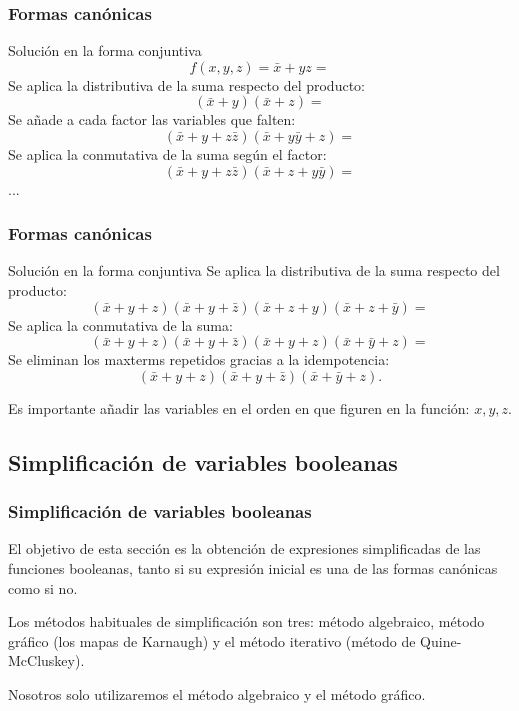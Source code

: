 \documentclass{beamer}
\begin{document}
\begin{frame}
\frametitle{Formas can\'onicas}
\begin{block}{Soluci\'on en la forma conjuntiva}
\[f(x,y,z) = \bar{x} + yz =\]
Se aplica la distributiva de la suma respecto del producto:
\[ (\bar x + y)(\bar x+z) = \]
Se a\~nade a cada factor las variables que falten:
\[ (\bar x + y +z\bar z)(\bar x+y\bar y+z) = \]
Se aplica la conmutativa de la suma seg\'un el factor:
\[ (\bar x + y +z\bar z)(\bar x+z+y\bar y) = \]
...
\end{block}
\end{frame}


\begin{frame}
\frametitle{Formas can\'onicas}
\begin{block}{Soluci\'on en la forma conjuntiva}
Se aplica la distributiva de la suma respecto del producto:
\[ (\bar x + y +z)(\bar x + y +\bar z)(\bar x+z+y)(\bar x+z+\bar y) = \]
Se aplica la conmutativa de la suma:
\[ (\bar x + y +z)(\bar x + y +\bar z)(\bar x+y+z)(\bar x+\bar y+z) = \]
Se eliminan los maxterms repetidos gracias a la idempotencia:
\[ (\bar x + y +z)(\bar x + y +\bar z)(\bar x+\bar y+z). \]
\end{block}
Es importante a\~nadir las variables en el orden en que figuren en la funci\'on: $x,y,z$.
\end{frame}




\subsection{Simplificaci\'on de variables booleanas}


\begin{frame}
\frametitle{Simplificaci\'on de variables booleanas}
El objetivo de esta secci\'on es la obtenci\'on de expresiones simplificadas de las funciones booleanas, tanto si su expresi\'on inicial es una de las formas can\'onicas como si no.

Los m\'etodos habituales de simplificaci\'on son tres: m\'etodo algebraico, m\'etodo gr\'afico (los mapas de Karnaugh) y el m\'etodo iterativo (m\'etodo de Quine-McCluskey).

Nosotros solo utilizaremos el m\'etodo algebraico y el m\'etodo gr\'afico.
\end{frame}
\end{document}
